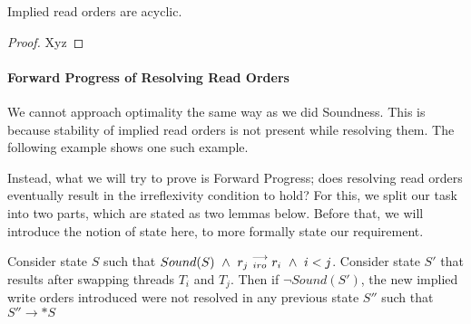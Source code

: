         \begin{property}
            \label{acyclic-iro}
            Implied read orders are acyclic.
        \end{property}

        \begin{proof}
            Xyz
        \end{proof}

    \paragraph{Forward Progress of Resolving Read Orders}

        We cannot approach optimality the same way as we did Soundness.
        This is because stability of implied read orders is not present while resolving them.
        The following example shows one such example. 
    

        Instead, what we will try to prove is Forward Progress; does resolving read orders eventually result in the irreflexivity condition to hold? 
        For this, we split our task into two parts, which are stated as two lemmas below. 
        Before that, we will introduce the notion of state here, to more formally state our requirement. 
        


        

        \begin{lemma}
            \label{iwo-unres-iro}
            Consider state $S$ such that $Sound(S) \ \wedge \ \reln{r_j}{iro}{r_i} \ \wedge \ i < j$.
            Consider state $S'$ that results after swapping threads $T_i$ and $T_j$. 
            Then if $\neg Sound(S')$, the new implied write orders introduced were not resolved in any previous state $S''$ such that $S'' \to * S$ 
        
        \end{lemma}


